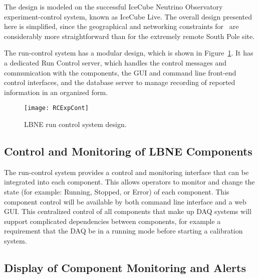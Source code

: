 The design is modeled on the successful IceCube Neutrino Observatory
experiment-control system, known as IceCube
Live\cite{comp:icecube-live}.  The overall design presented here is
simplified, since the geographical and networking constraints for
\LBNE\ are considerably more straightforward than for the extremely
remote South Pole site.


The run-control system has a modular design, which is shown in
Figure~\ref{fig:expcont}.  It has a dedicated Run Control server,
which handles the control messages and communication with the
components, the GUI and command line front-end control interfaces, and
the database server to manage recording of reported information in an
organized form.

\begin{figure}[htb]
  \centering
  \begin{center}
    \texttt{[image: RCExpCont]}
  \end{center}
    \caption[Run control system]{LBNE run control system design.}
  \label{fig:expcont}
\end{figure}

\subsection{Control and Monitoring of LBNE Components}

The run-control system provides a control and monitoring
interface that can be integrated into each component.  This allows
operators to monitor and change the state (for example: Running,
Stopped, or Error) of each component.  This component control will be
available by both command line interface and a web GUI.%
This centralized control of all components that make up
DAQ systems will support complicated dependencies between components,
for example a requirement that the DAQ be in a running mode before
starting a calibration system.

\subsection{Display of Component Monitoring and Alerts}

